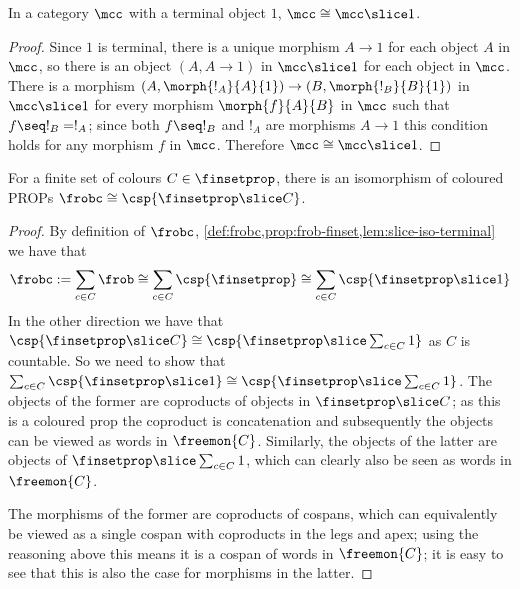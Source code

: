 \begin{lemma}
    \label{lem:slice-iso-terminal}
    In a category \(\mcc\) with a terminal object \(1\),
    \(\mcc \cong \mcc \slice 1\).
\end{lemma}
\begin{proof}
    Since \(1\) is terminal, there is a unique morphism \(A \to 1\) for each
    object \(A\) in \(\mcc\), so there is an object \((A, A \to 1)\) in
    \(\mcc \slice 1\) for each object in \(\mcc\).
    There is a morphism \((A, \morph{!_A}{A}{1}) \to (B, \morph{!_B}{B}{1})\) in
    \(\mcc \slice 1\) for every morphism \(\morph{f}{A}{B}\) in \(\mcc\) such
    that \(f \seq !_B = !_A\); since both \(f \seq !_B\) and \(!_A\) are
    morphisms \(A \to 1\) this condition holds for any morphism \(f\) in
    \(\mcc\).
    Therefore \(\mcc \cong \mcc \slice 1\).
\end{proof}

\begin{theorem}
    \label{thm:frobc-iso-finset-slice-c}
    For a finite set of colours \(C \in \finsetprop\), there is an isomorphism
    of coloured PROPs \(\frobc \cong \csp{\finsetprop \slice C}\).
\end{theorem}
\begin{proof}
    By definition of \(\frobc\),
    \cref{def:frobc,prop:frob-finset,lem:slice-iso-terminal}
    we have that \[
        \frobc
        :=
        \sum_{c \in C}\frob
        \cong
        \sum_{c \in C}\csp{\finsetprop}
        \cong
        \sum_{c \in C}\csp{\finsetprop \slice 1}
    \]
    In the other direction we have that \(
        \csp{\finsetprop \slice C}
        \cong
        \csp{\finsetprop \slice \sum_{c \in C} 1}
    \) as \(C\) is countable.
    So we need to show that \(
        \sum_{c \in C}\csp{\finsetprop \slice 1}
        \cong
        \csp{\finsetprop \slice \sum_{c \in C} 1}
    \).
    The objects of the former are coproducts of objects in
    \(\finsetprop \slice C\); as this is a coloured prop the coproduct is
    concatenation and subsequently the objects can be viewed as words in
    \(\freemon{C}\).
    Similarly, the objects of the latter are objects of
    \(\finsetprop \slice \sum_{c \in C} 1\), which can clearly also be
    seen as words in \(\freemon{C}\).

    The morphisms of the former are coproducts of cospans, which can
    equivalently be viewed as a single cospan with coproducts in the legs and
    apex; using the reasoning above this means it is a cospan of words in
    \(\freemon{C}\); it is easy to see that this is also the case for morphisms
    in the latter.
\end{proof}

